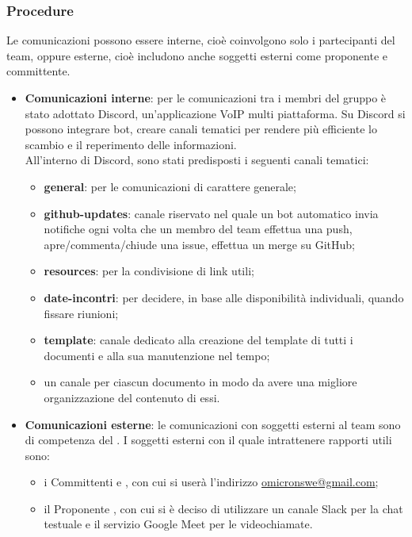 \subsubsection{Procedure}
Le comunicazioni possono essere interne, cioè coinvolgono solo i partecipanti del team, oppure esterne, cioè includono anche soggetti esterni come proponente e committente.
\begin{itemize}
	\item \textbf{Comunicazioni interne}: per le comunicazioni tra i membri del gruppo è stato adottato Discord, un'applicazione VoIP multi piattaforma. Su Discord si possono integrare bot, creare canali tematici per rendere più efficiente lo scambio e il reperimento delle informazioni. \\
	All'interno di Discord, sono stati predisposti i seguenti canali tematici:
	\begin{itemize}
	\item \textbf{general}: per le comunicazioni di carattere generale;
	\item \textbf{github-updates}: canale riservato nel quale un bot automatico invia notifiche ogni volta che un membro del team effettua una push, apre/commenta/chiude una issue, effettua un merge su GitHub;
	\item \textbf{resources}: per la condivisione di link utili;
	\item \textbf{date-incontri}: per decidere, in base alle disponibilità individuali, quando fissare riunioni;
	\item \textbf{template}: canale dedicato alla creazione del template di tutti i documenti e alla sua manutenzione nel tempo;
	\item un canale per ciascun documento in modo da avere una migliore organizzazione del contenuto di essi. 
	\end{itemize}
	\item \textbf{Comunicazioni esterne}: le comunicazioni con soggetti esterni al team sono di competenza del \respProg . I soggetti esterni con il quale intrattenere rapporti utili sono:
	\begin{itemize}
		\item i Committenti \textbf{\VT} e \textbf{\CR}, con cui si userà l'indirizzo \url{omicronswe@gmail.com};
		\item il Proponente \textbf{\Proponente}, con cui si è deciso di utilizzare un canale Slack per la chat testuale e il servizio Google Meet per le videochiamate.
	\end{itemize}
\end{itemize}

